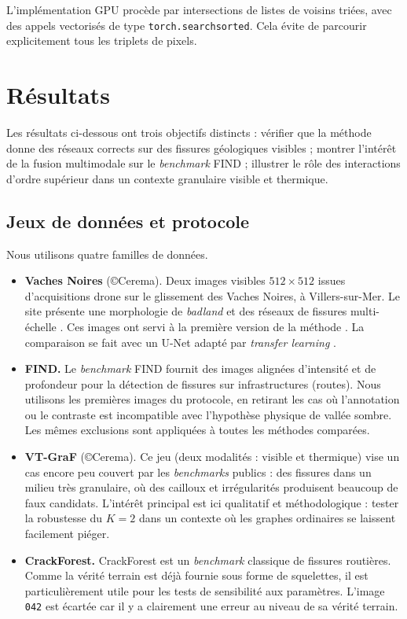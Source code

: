 L'implémentation GPU procède par intersections de listes de voisins triées, avec des appels vectorisés de type \texttt{torch.searchsorted}. Cela évite de parcourir explicitement tous les triplets de pixels.

\section{Résultats}
\label{sec:chapIII_resultats}

Les résultats ci-dessous ont trois objectifs distincts : vérifier que la méthode donne des réseaux corrects sur des fissures géologiques visibles ; montrer l'intérêt de la fusion multimodale sur le \emph{benchmark} FIND \cite{FIND2022} ; illustrer le rôle des interactions d'ordre supérieur dans un contexte granulaire visible et thermique.

\subsection{Jeux de données et protocole}
\label{subsec:chapIII_donnees}

Nous utilisons quatre familles de données.

\begin{itemize}
    \item \textbf{Vaches Noires} (\copyright Cerema). Deux images visibles $512\times512$ issues d'acquisitions drone sur le glissement des Vaches Noires, à Villers-sur-Mer. Le site présente une morphologie de \emph{badland} et des réseaux de fissures multi-échelle \cite{fauchard2023diachronic}. Ces images ont servi à la première version de la méthode \cite{BibiStrasbourg}. La comparaison se fait avec un U-Net adapté par \emph{transfer learning} \cite{UNetTransferLearningCracks2023}.
    \item \textbf{FIND.} Le \emph{benchmark} FIND \cite{FIND2022} fournit des images alignées d'intensité et de profondeur pour la détection de fissures sur infrastructures (routes). Nous utilisons les premières images du protocole, en retirant les cas où l'annotation ou le contraste est incompatible avec l'hypothèse physique de vallée sombre. Les mêmes exclusions sont appliquées à toutes les méthodes comparées.
    \item \textbf{VT-GraF} (\copyright Cerema). Ce jeu (deux modalités : visible et thermique) vise un cas encore peu couvert par les \emph{benchmarks} publics : des fissures dans un milieu très granulaire, où des cailloux et irrégularités produisent beaucoup de faux candidats. L'intérêt principal est ici qualitatif et méthodologique : tester la robustesse du $K=2$ dans un contexte où les graphes ordinaires se laissent facilement piéger.
    \item \textbf{CrackForest.} CrackForest \cite{shi2016automatic} est un \emph{benchmark} classique de fissures routières. Comme la vérité terrain est déjà fournie sous forme de squelettes, il est particulièrement utile pour les tests de sensibilité aux paramètres. L'image \texttt{042} est écartée car il y a clairement une erreur au niveau de sa vérité terrain.
\end{itemize}

